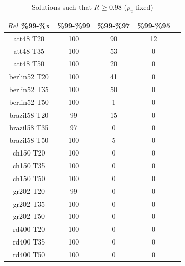 \begin{table}
\caption{Solutions such that $R \geq 0.98$ ($p_v$ fixed)} %
\centering  %
\begin{tabular}{|c|c|c|c|c|} %
\hline	$Rel$ \%99-\%x  &	\%99-\%99 & \%99-\%97 & \%99-\%95\\
\hline	att48 T20	&	100	&	90	&	12	\\
\hline	att48 T35	&	100	&	53	&	0	\\
\hline	att48 T50	&	100	&	20	&	0	\\
\hline	berlin52 T20	&	100	&	41	&	0	\\
\hline	berlin52 T35	&	100	&	50	&	0	\\
\hline	berlin52 T50	&	100	&	1	&	0	\\
\hline	brazil58 T20	&	99	&	15	&	0	\\
\hline	brazil58 T35	&	97	&	0	&	0	\\
\hline	brazil58 T50	&	100	&	5	&	0	\\
\hline	ch150 T20	&	100	&	0	&	0	\\
\hline	ch150 T35	&	100	&	0	&	0	\\
\hline	ch150 T50	&	100	&	0	&	0	\\
\hline	gr202 T20	&	99	&	0	&	0	\\
\hline	gr202 T35	&	100	&	0	&	0	\\
\hline	gr202 T50	&	100	&	0	&	0	\\
\hline	rd400 T20	&	100	&	0	&	0	\\
\hline	rd400 T35	&	100	&	0	&	0	\\
\hline	rd400 T50	&	100	&	0	&	0	\\
\hline
\end{tabular}
\label{answer2a} %
\end{table}

